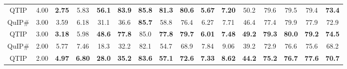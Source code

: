 \begin{table}[t]
\begin{tabular}{@{}cccccccccccccccc@{}}
\rowcolor[HTML]{D9D9D9} 
QTIP                 & \multicolumn{1}{c|}{\cellcolor[HTML]{D9D9D9}4.00} & \textbf{2.75} & \multicolumn{1}{c|}{\cellcolor[HTML]{D9D9D9}5.83}          & \textbf{56.1} & \textbf{83.9} & \textbf{85.8} & \textbf{81.3} & \multicolumn{1}{c|}{\cellcolor[HTML]{D9D9D9}\textbf{80.6}} & \textbf{5.67} & \multicolumn{1}{c|}{\cellcolor[HTML]{D9D9D9}\textbf{7.20}} & 50.2          & 79.6          & 79.5          & 79.4          & \textbf{73.4} \\
QuIP\#               & \multicolumn{1}{c|}{3.00}                         & 3.59          & \multicolumn{1}{c|}{6.18}                                  & 31.1          & 36.6          & \textbf{85.7} & 58.8          & \multicolumn{1}{c|}{76.4}                                  & 6.27          & \multicolumn{1}{c|}{7.71}                                  & 46.4          & 77.4          & 79.9          & 77.9          & 72.9          \\
QTIP                 & \multicolumn{1}{c|}{3.00}                         & \textbf{3.18} & \multicolumn{1}{c|}{5.98}                                  & \textbf{48.6} & \textbf{77.8} & 85.0          & \textbf{77.8} & \multicolumn{1}{c|}{\textbf{79.7}}                         & \textbf{6.01} & \multicolumn{1}{c|}{\textbf{7.48}}                         & \textbf{49.2} & \textbf{79.3} & \textbf{80.0} & \textbf{79.2} & \textbf{74.5} \\
\rowcolor[HTML]{D9D9D9} 
QuIP\#               & \multicolumn{1}{c|}{\cellcolor[HTML]{D9D9D9}2.00} & 5.77          & \multicolumn{1}{c|}{\cellcolor[HTML]{D9D9D9}7.46}          & 18.3          & 32.2 & 82.1          & 54.7          & \multicolumn{1}{c|}{\cellcolor[HTML]{D9D9D9}68.9}          & 7.84          & \multicolumn{1}{c|}{\cellcolor[HTML]{D9D9D9}9.06}          & 39.2          & 72.9          & 76.6          & 75.6          & 68.2          \\
\rowcolor[HTML]{D9D9D9} 
QTIP                 & \multicolumn{1}{c|}{\cellcolor[HTML]{D9D9D9}2.00} & \textbf{4.97} & \multicolumn{1}{c|}{\cellcolor[HTML]{D9D9D9}\textbf{6.80}} & \textbf{28.0} & \textbf{35.2}          & \textbf{83.6} & \textbf{57.1} & \multicolumn{1}{c|}{\cellcolor[HTML]{D9D9D9}\textbf{72.6}} & \textbf{7.33} & \multicolumn{1}{c|}{\cellcolor[HTML]{D9D9D9}\textbf{8.62}} & \textbf{44.2} & \textbf{75.2} & \textbf{76.7} & \textbf{77.6} & \textbf{70.7} \\ \bottomrule
\end{tabular}
\label{tab:llama3}
\end{table}